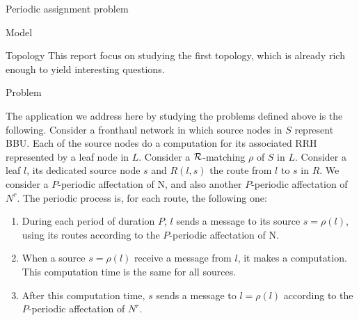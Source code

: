 \documentclass[a4paper,10pt]{report}
\begin{document}
\begin{chapter}{Periodic assignment problem}
\begin{section}{Model}
\begin{subsection}{Topology}
This report focus on studying the first topology, which is already rich enough to yield interesting questions.

\end{subsection}

\end{section}
\begin{section}{Problem}
   
The application we address here by studying the problems defined above is the following. Consider a fronthaul network in which source nodes in $S$ represent BBU.
Each of the source nodes do a computation for its associated RRH represented by a leaf node in $L$. Consider a ${\cal R}$-matching $\rho$ of $S$ in $L$. Consider a leaf $l$, its dedicated source node $s$
and $R(l,s)$ the route from $l$ to $s$ in $R$. We consider a $P$-periodic affectation of N, and also another $P$-periodic affectation of $N^{r}$.
The periodic process is, for each route, the following one:
\begin{enumerate}
 \item During each period of duration $P$, $l$ sends a message to its source $s=\rho(l)$, using its routes according to the $P$-periodic affectation of N. 
 \item When a source $s=\rho(l)$ receive a message from $l$, it makes a computation. This computation time is the same for all sources.
 \item After this computation time, $s$ sends a message to $l=\rho(l)$ according to the $P$-periodic affectation of $N^{r}$.
\end{enumerate}

\begin{center}
\end{center}
\end{section}
\end{chapter}
\end{document}
